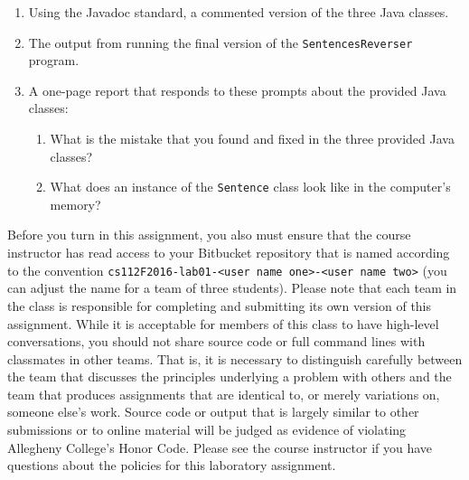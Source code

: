 \vspace*{-.05in}
\begin{enumerate}

  \itemsep 0em
  \item Using the Javadoc standard, a commented version of the three Java classes.

  \item The output from running the final version of the {\tt SentencesReverser} program.

  \item A one-page report that responds to these prompts about the provided Java classes:

    \vspace*{-.05in}
    \begin{enumerate}
      \itemsep 0em

      \item What is the mistake that you found and fixed in the three provided Java classes?

      \item What does an instance of the {\tt Sentence} class look like in the computer's memory?


    \end{enumerate}

\end{enumerate}

\vspace*{-.05in}

Before you turn in this assignment, you also must ensure that the course instructor has read access to your Bitbucket
repository that is named according to the convention {\tt cs112F2016-lab01-<user name one>-<user name two>} (you can
adjust the name for a team of three students). Please note that each team in the class is responsible for completing and
submitting its own version of this assignment. While it is acceptable for members of this class to have high-level
conversations, you should not share source code or full command lines with classmates in other teams. That is, it is
necessary to distinguish carefully between the team that discusses the principles underlying a problem with others and
the team that produces assignments that are identical to, or merely variations on, someone else's work.  Source code or
output that is largely similar to other submissions or to online material will be judged as evidence of violating
Allegheny College's Honor Code. Please see the course instructor if you have questions about the policies for this
laboratory assignment.


